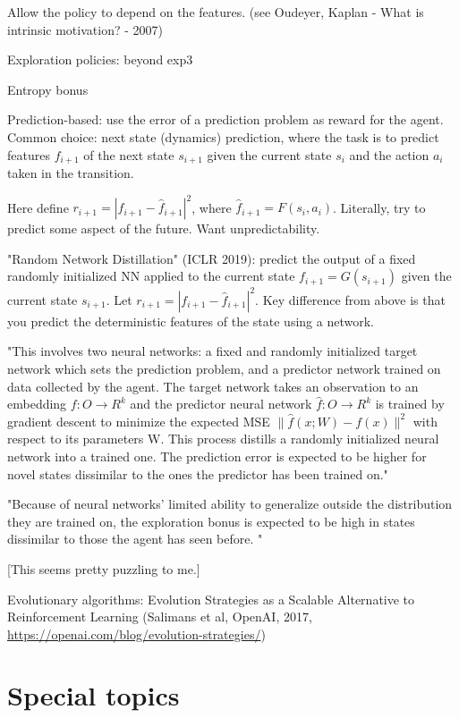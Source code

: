 \documentclass[english]{article}
\begin{document}
Allow the policy to depend on the features. (see Oudeyer, Kaplan - What is intrinsic motivation?  - 2007)

\item Exploration policies: beyond exp3

Entropy bonus

Prediction-based: use the error of a prediction problem as reward for the agent. Common choice: next state (dynamics) prediction, where the task is to predict features $f_{i+1}$ of the next state $s_{i+1}$ given the current state $s_i$ and the action $a_i$ taken in the transition. 

Here define $r_{i+1} = |f_{i+1}-\hat f_{i+1}|^2$, where $\hat f_{i+1} = F(s_{i},a_i)$. Literally, try to predict some aspect of the future. Want unpredictability.


"Random Network Distillation" (ICLR 2019): predict the output of a fixed randomly initialized NN applied to the current state $f_{i+1} = G(s_{i+1})$ given the current state $s_{i+1}$. Let $r_{i+1} = |f_{i+1}-\hat f_{i+1}|^2$. Key difference from above is that you predict the deterministic features of the state using a network. 

"This involves two neural networks: a fixed and randomly initialized target network which sets the
prediction problem, and a predictor network trained on data collected by the agent. The target network
takes an observation to an embedding $f : O \to R^k$ and the predictor neural network $\hat f : O \to R^k$
is trained by gradient descent to minimize the expected MSE $\|\hat f(x;W) - f(x)\|^2$ with respect to its
parameters W. This process distills a randomly initialized neural network into a trained one. The
prediction error is expected to be higher for novel states dissimilar to the ones the predictor has been
trained on."

"Because of neural networks' limited ability to generalize outside the distribution they are trained on, the exploration bonus is expected to be high in states dissimilar to those the agent has seen before. "


[This seems pretty puzzling to me.]

\item Evolutionary algorithms: Evolution Strategies as a Scalable Alternative to Reinforcement Learning (Salimans et al, OpenAI, 2017, \url{https://openai.com/blog/evolution-strategies/})


\eenum 

\section{Special topics}
%
\end{document}
